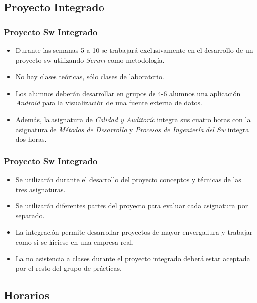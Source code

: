 \documentclass[animated,a4paper,slidestop,xcolor=pst,blue]{beamer}
\begin{document}
\subsection{Proyecto Integrado}

\begin{frame}[c]
	\frametitle{Proyecto Sw Integrado}
	\begin{itemize}[<+->]
        \item Durante las semanas 5 a 10 se trabajará exclusivamente en el desarrollo de un proyecto sw utilizando \emph{Scrum} como metodología.
        \item No hay clases teóricas, sólo clases de laboratorio.
        \item Los alumnos deberán desarrollar en grupos de 4-6 alumnos una aplicación \emph{Android} para la visualización de una fuente externa de datos.
        \item Además, la asignatura de \emph{Calidad y Auditoría} integra sus cuatro horas con la asignatura de \emph{Métodos de Desarrollo} y \emph{Procesos de Ingeniería del Sw} integra dos horas.
	\end{itemize}
\end{frame}

\begin{frame}[c]
	\frametitle{Proyecto Sw Integrado}
	\begin{itemize}[<+->]
        \item Se utilizarán durante el desarrollo del proyecto conceptos y técnicas de las tres asignaturas.
        \item Se utilizarán diferentes partes del proyecto para evaluar cada asignatura por separado.
        \item La integración permite desarrollar proyectos de mayor envergadura y trabajar como si se hiciese en una empresa real.
        \item La no asistencia a clases durante el proyecto integrado deberá estar aceptada por el resto del grupo de prácticas.
	\end{itemize}
\end{frame}

\subsection{Horarios}
\end{document}
